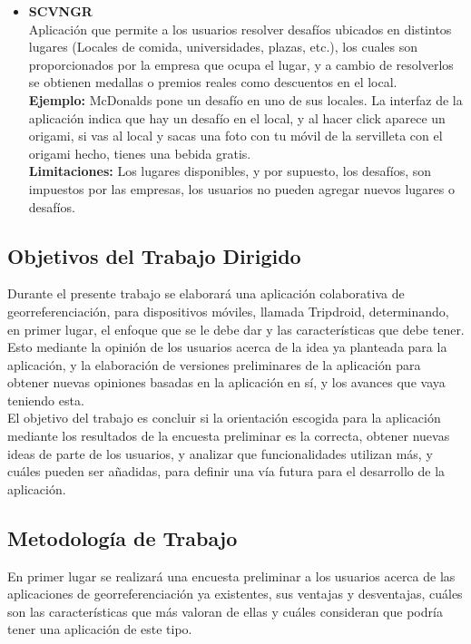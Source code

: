 \documentclass[10pt,letterpaper]{article}
\begin{document}
\begin{itemize}
\item \textbf{SCVNGR}\\

Aplicación que permite a los usuarios resolver desafíos ubicados en distintos lugares (Locales de comida, universidades, plazas, etc.), los cuales son proporcionados por la empresa que ocupa el lugar, y a cambio de resolverlos se obtienen medallas o premios reales como descuentos en el local.\\
\textbf{Ejemplo:} McDonalds pone un desafío en uno de sus locales. La interfaz de la aplicación indica que hay un desafío en el local, y al hacer click aparece un origami, si vas al local y sacas una foto con tu móvil de la servilleta con el origami hecho, tienes una bebida gratis.\\
\textbf{Limitaciones:} Los lugares disponibles, y por supuesto, los desafíos, son impuestos por las empresas, los usuarios no pueden agregar nuevos lugares o desafíos.
\end{itemize}

\newpage
\subsection{Objetivos del Trabajo Dirigido}

Durante el presente trabajo se elaborará una aplicación colaborativa de georreferenciación, para dispositivos móviles, llamada Tripdroid, determinando, en primer lugar, el enfoque que se le debe dar y las características que debe tener. Esto mediante la opinión de los usuarios acerca de la idea ya planteada para la aplicación, y la elaboración de versiones preliminares de la aplicación para obtener nuevas opiniones basadas en la aplicación en sí, y los avances que vaya teniendo esta.\\

El objetivo del trabajo es concluir si la orientación escogida para la aplicación mediante los resultados de la encuesta preliminar es la correcta, obtener nuevas ideas de parte de los usuarios, y analizar que funcionalidades utilizan más, y cuáles pueden ser añadidas, para definir una vía futura para el desarrollo de la aplicación.

\subsection{Metodología de Trabajo}

En primer lugar se realizará una encuesta preliminar a los usuarios acerca de las aplicaciones de georreferenciación ya existentes, sus ventajas y desventajas, cuáles son las características que más valoran de ellas y cuáles consideran que podría tener una aplicación de este tipo.\\
\end{document}
